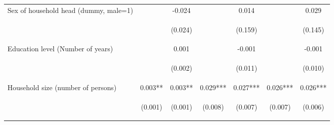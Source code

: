 \begin{center}
\begin{tabular}{lcccccc}
Sex of household head (dummy, male=1) &  & -0.024 &  & 0.014 &  & 0.029 \\
\vspace{4pt} & \begin{footnotesize}\end{footnotesize} & \begin{footnotesize}(0.024)\end{footnotesize} & \begin{footnotesize}\end{footnotesize} & \begin{footnotesize}(0.159)\end{footnotesize} & \begin{footnotesize}\end{footnotesize} & \begin{footnotesize}(0.145)\end{footnotesize} \\
Education level (Number of years) &  & 0.001 &  & -0.001 &  & -0.001 \\
\vspace{4pt} & \begin{footnotesize}\end{footnotesize} & \begin{footnotesize}(0.002)\end{footnotesize} & \begin{footnotesize}\end{footnotesize} & \begin{footnotesize}(0.011)\end{footnotesize} & \begin{footnotesize}\end{footnotesize} & \begin{footnotesize}(0.010)\end{footnotesize} \\
Household size (number of persons) & 0.003** & 0.003** & 0.029*** & 0.027*** & 0.026*** & 0.026*** \\
\vspace{4pt} & \begin{footnotesize}(0.001)\end{footnotesize} & \begin{footnotesize}(0.001)\end{footnotesize} & \begin{footnotesize}(0.008)\end{footnotesize} & \begin{footnotesize}(0.007)\end{footnotesize} & \begin{footnotesize}(0.007)\end{footnotesize} & \begin{footnotesize}(0.006)\end{footnotesize} \\

\end{tabular}
\end{center}
